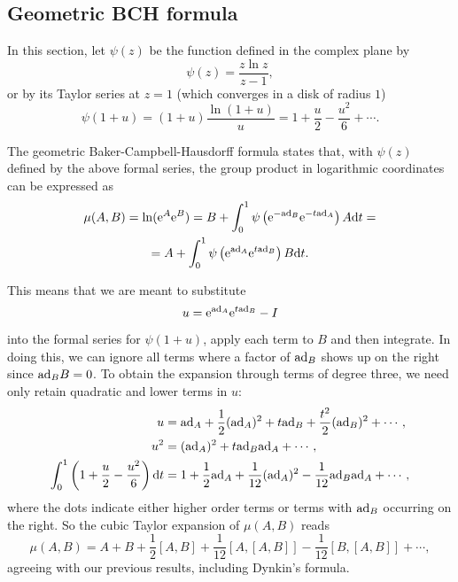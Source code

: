 \subsection{Geometric BCH formula}

In this section, let $\psi(z)$ be the function defined in the complex plane by
\[\psi(z)=\frac{z\ln z}{z-1},\]
or by its Taylor series at $z=1$ (which converges in a disk of radius $1$)
\[\psi(1+u)=(1+u)\frac{\ln (1+u)}{u}=1+\frac{u}{2}-\frac{u^2}{6}+\cdots .\]

\begin{thm}
The geometric Baker-Campbell-Hausdorff formula states that, with $\psi(z)$ defined by the above formal series, the group product in logarithmic coordinates can be expressed as
\begin{multline}
    \mu(A,B) =\ln(\mathrm{e}^A\mathrm{e}^B)=
    B+\int_0^1\psi\left(\mathrm{e}^{-\mathrm{ad}_B}\mathrm{e}^{-t\mathrm{ad}_A}\right)A{\mathrm{d}} t=\\
    =A+\int_0^1\psi\left(\mathrm{e}^{\mathrm{ad}_A}\mathrm{e}^{t\mathrm{ad}_B}\right)B{\mathrm{d}} t.\label{eq geom BCH}
\end{multline}
\end{thm}

This means that we are meant to substitute 
\[u=\mathrm{e}^{\mathrm{ad}_A}\mathrm{e}^{t\mathrm{ad}_B}-I\]
into the formal series for $\psi(1+u)$, apply each term to $B$ and then integrate. In doing this, we can ignore all terms where a factor of $\mathrm{ad}_B$ shows up on the right since $\mathrm{ad}_B B=0$. To obtain the expansion through terms of degree three, we need only retain quadratic and lower terms in $u$:
\begin{align}
    u  &=\mathrm{ad}_A+\frac12(\mathrm{ad}_A)^2+t\mathrm{ad}_B+\frac{t^2}{2}(\mathrm{ad}_B)^2+\cdots,\\
    u^2&=(\mathrm{ad}_A)^2+t\mathrm{ad}_B\mathrm{ad}_A+\cdots,\\
    \int_0^1\left(1+\frac u2-\frac{u^2}{6}\right){\mathrm{d}} t&= 1+\frac 12\mathrm{ad}_A+\frac{1}{12}(\mathrm{ad}_A)^2-\frac{1}{12}\mathrm{ad}_B \mathrm{ad}_A+\cdots,
\end{align}
where the dots indicate either higher order terms or terms with $\mathrm{ad}_B$ occurring on the right. So the cubic Taylor expansion of $\mu(A,B)$ reads
\[\mu(A,B)=A+B+\frac12[A,B]+\frac{1}{12}[A,[A,B]]-\frac{1}{12}[B,[A,B]]+\cdots,\]
agreeing with our previous results, including Dynkin's formula.

